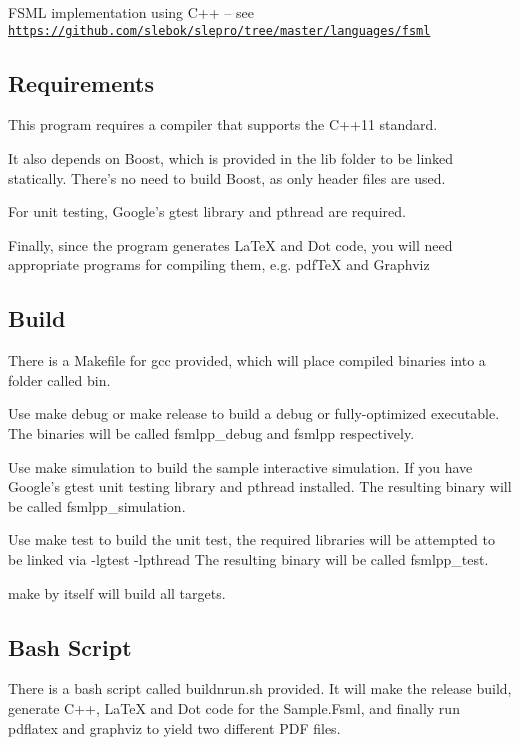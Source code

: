 F\-S\-M\-L implementation using C++ -- see \href{https://github.com/slebok/slepro/tree/master/languages/fsml}{\tt https\-://github.\-com/slebok/slepro/tree/master/languages/fsml}

\subsection*{Requirements }

This program requires a compiler that supports the C++11 standard.

It also depends on Boost, which is provided in the lib folder to be linked statically. There's no need to build Boost, as only header files are used.

For unit testing, Google's gtest library and pthread are required.

Finally, since the program generates La\-Te\-X and Dot code, you will need appropriate programs for compiling them, e.\-g. pdf\-Te\-X and Graphviz

\subsection*{Build }

There is a Makefile for gcc provided, which will place compiled binaries into a folder called bin.

Use {\ttfamily make debug} or {\ttfamily make release} to build a debug or fully-\/optimized executable. The binaries will be called {\ttfamily fsmlpp\-\_\-debug} and {\ttfamily fsmlpp} respectively.

Use {\ttfamily make simulation} to build the sample interactive simulation. If you have Google's gtest unit testing library and pthread installed. The resulting binary will be called {\ttfamily fsmlpp\-\_\-simulation}.

Use {\ttfamily make test} to build the unit test, the required libraries will be attempted to be linked via {\ttfamily -\/lgtest -\/lpthread} The resulting binary will be called {\ttfamily fsmlpp\-\_\-test}.

{\ttfamily make} by itself will build all targets.

\subsection*{Bash Script }

There is a bash script called {\ttfamily buildnrun.\-sh} provided. It will make the release build, generate C++, La\-Te\-X and Dot code for the Sample.\-Fsml, and finally run {\ttfamily pdflatex} and {\ttfamily graphviz} to yield two different P\-D\-F files.

